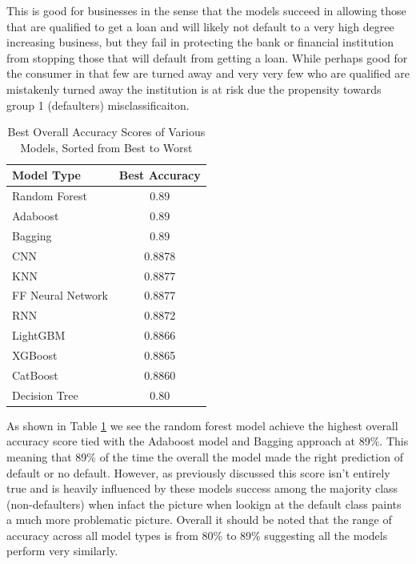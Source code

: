 \documentclass[12pt]{article}
\begin{document}
This is good for businesses in the sense that the models succeed in allowing those that are qualified to get a loan and will likely not default to a very high degree increasing business, but they fail in protecting the bank or financial institution from stopping those that will default from getting a loan. While perhaps good for the consumer in that few are turned away and very very few who are qualified are mistakenly turned away the institution is at risk due the propensity towards group 1 (defaulters) misclassificaiton.

\begin{table}[hbt!]
    \centering
    \caption{Best Overall Accuracy Scores of Various Models, Sorted from Best to Worst}
    \label{tab:accuracies}
    \begin{tabular}{lc}
        \toprule
        Model Type          & Best Accuracy \\
        \midrule
        Random Forest       & 0.89 \\
        Adaboost            & 0.89 \\
        Bagging             & 0.89 \\
        CNN                 & 0.8878 \\
        KNN                 & 0.8877 \\
        FF Neural Network   & 0.8877 \\
        RNN                 & 0.8872 \\
        LightGBM            & 0.8866 \\
        XGBoost             & 0.8865 \\
        CatBoost            & 0.8860 \\
        Decision Tree       & 0.80 \\
        \bottomrule
    \end{tabular}
    \label{table:overallModelResults}
\end{table}

As shown in Table \ref{table:overallModelResults} we see the random forest model achieve the highest overall accuracy score tied with the Adaboost model and Bagging approach at 89\%. This meaning that 89\% of the time the overall the model made the right prediction of default or no default. However, as previously discussed this score isn't entirely true and is heavily influenced by these models success among the majority class (non-defaulters) when infact the picture when lookign at the default class paints a much more problematic picture. Overall it should be noted that the range of accuracy across all model types is from 80\% to 89\% suggesting all the models perform very similarly.
\end{document}
